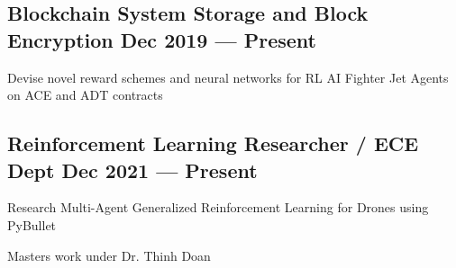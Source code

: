 \subsection{{Blockchain System Storage and Block Encryption \hfill Dec 2019 --- Present}}
\begin{zitemize}
	\item Devise novel reward schemes and neural networks for RL AI Fighter Jet Agents on ACE and ADT contracts
\end{zitemize}

\subsection{{Reinforcement Learning Researcher / ECE Dept  \hfill Dec 2021 --- Present}}
\begin{zitemize}
	\item Research Multi-Agent Generalized Reinforcement Learning for Drones using PyBullet
	\item Masters work under Dr. Thinh Doan
\end{zitemize}

